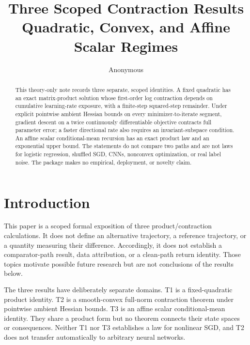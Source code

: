 \documentclass{article}
\title{Three Scoped Contraction Results\\
Quadratic, Convex, and Affine Scalar Regimes}
\author{Anonymous}
\begin{document}
\maketitle

\begin{abstract}
This theory-only note records three separate, scoped identities. A fixed
quadratic has an exact matrix-product solution whose first-order log
contraction depends on cumulative learning-rate exposure, with a finite-step
squared-step remainder. Under explicit pointwise ambient Hessian bounds on
every minimizer-to-iterate segment, gradient descent on a twice continuously
differentiable objective contracts full parameter error; a faster directional
rate also requires an invariant-subspace condition. An affine scalar
conditional-mean recursion has an exact product law and an exponential upper
bound. The statements do not compare two paths and are not laws for logistic
regression, shuffled SGD, CNNs, nonconvex optimization, or real label noise.
The package makes no empirical, deployment, or novelty claim.
\end{abstract}

\section{Introduction}
\label{sec:intro}

This paper is a scoped formal exposition of three product/contraction
calculations. It does not define an alternative trajectory, a reference
trajectory, or a quantity measuring their difference. Accordingly, it does
not establish a comparator-path result, data attribution, or a clean-path
return identity. Those topics motivate possible future research but are not
conclusions of the results below.

The three results have deliberately separate domains. T1 is a fixed-quadratic
product identity. T2 is a smooth-convex full-norm contraction theorem under
pointwise ambient Hessian bounds. T3 is an affine scalar conditional-mean
identity. They share a product form but no theorem connects their state spaces
or consequences. Neither T1 nor T3 establishes a law for nonlinear SGD, and
T2 does not transfer automatically to arbitrary neural networks.
\end{document}
